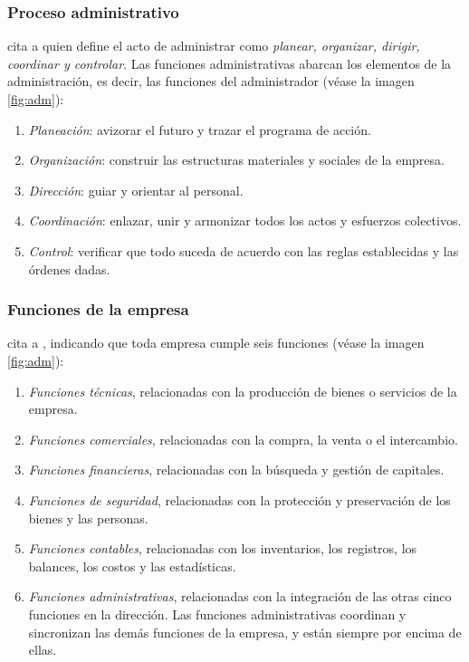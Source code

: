 \subsubsection{Proceso administrativo}
\cite{chiavenato} cita a \citep{fayol} quien define el acto de administrar como
\emph{planear, organizar, dirigir, coordinar y controlar}. Las funciones administrativas
abarcan los elementos de la administración, es decir, las funciones del administrador
(véase la imagen \ref{fig:adm}):
\begin{enumerate}
    \item \emph{Planeación}: avizorar el futuro y trazar el programa de acción.
    \item \emph{Organización}: construir las estructuras materiales y sociales de
          la empresa.
    \item \emph{Dirección}: guiar y orientar al personal.
    \item \emph{Coordinación}: enlazar, unir y armonizar todos los actos y esfuerzos
          colectivos.
    \item \emph{Control}: verificar que todo suceda de acuerdo con las reglas establecidas
          y las órdenes dadas.
\end{enumerate}

\subsubsection{Funciones de la empresa}
\cite{chiavenato} cita a \cite{fayol}, indicando que toda empresa cumple seis funciones
(véase la imagen \ref{fig:adm}):
\begin{enumerate}
    \item \emph{Funciones técnicas}, relacionadas con la producción de bienes o
          servicios de la empresa.
    \item \emph{Funciones comerciales}, relacionadas con la compra, la venta o el
          intercambio.
    \item \emph{Funciones financieras}, relacionadas con la búsqueda y gestión
          de capitales.
    \item \emph{Funciones de seguridad}, relacionadas con la protección y preservación
          de los bienes y las personas.
    \item \emph{Funciones contables}, relacionadas con los inventarios, los registros,
          los balances, los costos y las estadísticas.
    \item \emph{Funciones administrativas}, relacionadas con la integración de las
          otras cinco funciones en la dirección. Las funciones administrativas
          coordinan y sincronizan las demás funciones de la empresa, y están siempre
          por encima de ellas.
\end{enumerate}

